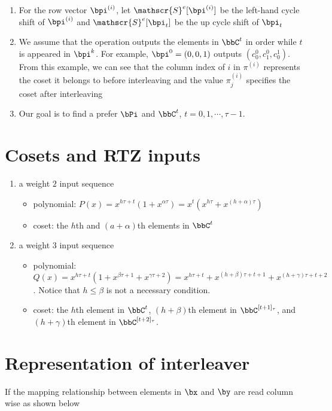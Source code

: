 \documentclass[11pt, oneside, dvipdfmx]{book}
\begin{document}
\begin{enumerate}
\item For the row vector $\bpi^{(i)}$, let $\mathscr{S}^e[\bpi^{(i)}]$ be the left-hand cycle shift of $\bpi^{(i)}$ and $\mathscr{S}^e[\bpi_t]$ be the up cycle shift of $\bpi_t$
\item We assume that the operation outputs the elements in $\bbC^t$ in order while $t$ is appeared in $\bpi^k$. For example, $\bpi^0 = (0,0,1)$ outputs $(c_0^0,c_1^0,c_0^1)$. From this example, we can see that the column index of $i$ in $\pi^{(i)}$ represents the coset it belongs to before interleaving and the value $\pi_{j}^{(i)}$ specifies the coset after interleaving
\item Our goal is to find a prefer $\bPi$ and $\bbC^t$, $t = 0,1,\cdots,\tau-1$.
\end{enumerate}


\section{Cosets and RTZ inputs}

\begin{enumerate}
\item a weight $2$ input sequence
\begin{itemize}
	\item polynomial: $P(x)=x^{h\tau+t}(1+x^{\alpha \tau}) = x^t(x^{h\tau}+x^{(h+\alpha)\tau})$
	\item coset: the $h$th and $(a+\alpha)$th elements in $\bbC^t$
\end{itemize}
\item a weight $3$ input sequence
\begin{itemize}
	\item polynomial: $Q(x) =x^{h\tau+t}(1+x^{\beta \tau +1}+x^{\gamma \tau +2})=x^{h\tau+t}+x^{(h+\beta) \tau +t+1}+x^{(h+\gamma) \tau +t+2}$. 
	Notice that $h \leq \beta$ is not a necessary condition.
	\item coset: the $h$th element in $\bbC^{t}$, $(h+\beta)$th element in $\bbC^{[t+1]_\tau}$, and $(h+\gamma)$th element in $\bbC^{[t+2]_\tau}$.
\end{itemize}
\end{enumerate}

\section{Representation of interleaver}
If the mapping relationship between elements in $\bx$ and $\by$ are read column wise as shown below
\end{document}
